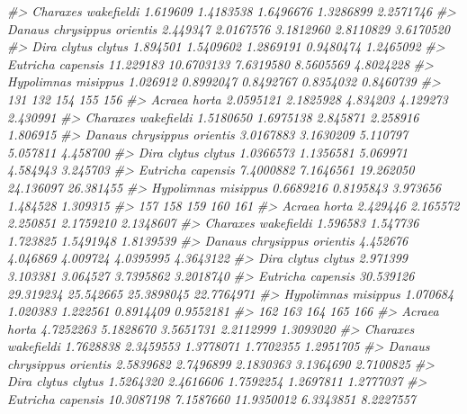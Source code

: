 \documentclass[
]{article}
\newenvironment{Shaded}{\begin{snugshade}}{\end{snugshade}}
\newcommand{\CommentTok}[1]{\textcolor[rgb]{0.56,0.35,0.01}{\textit{#1}}}
\begin{document}
\begin{Shaded}
\begin{Highlighting}[]
\CommentTok{\#\textgreater{} Charaxes wakefieldi         1.619609  1.4183538 1.6496676 1.3286899 2.2571746}
\CommentTok{\#\textgreater{} Danaus chrysippus orientis  2.449347  2.0167576 3.1812960 2.8110829 3.6170520}
\CommentTok{\#\textgreater{} Dira clytus clytus          1.894501  1.5409602 1.2869191 0.9480474 1.2465092}
\CommentTok{\#\textgreater{} Eutricha capensis          11.229183 10.6703133 7.6319580 8.5605569 4.8024228}
\CommentTok{\#\textgreater{} Hypolimnas misippus         1.026912  0.8992047 0.8492767 0.8354032 0.8460739}
\CommentTok{\#\textgreater{}                                  131       132       154       155       156}
\CommentTok{\#\textgreater{} Acraea horta               2.0595121 2.1825928  4.834203  4.129273  2.430991}
\CommentTok{\#\textgreater{} Charaxes wakefieldi        1.5180650 1.6975138  2.845871  2.258916  1.806915}
\CommentTok{\#\textgreater{} Danaus chrysippus orientis 3.0167883 3.1630209  5.110797  5.057811  4.458700}
\CommentTok{\#\textgreater{} Dira clytus clytus         1.0366573 1.1356581  5.069971  4.584943  3.245703}
\CommentTok{\#\textgreater{} Eutricha capensis          7.4000882 7.1646561 19.262050 24.136097 26.381455}
\CommentTok{\#\textgreater{} Hypolimnas misippus        0.6689216 0.8195843  3.973656  1.484528  1.309315}
\CommentTok{\#\textgreater{}                                  157       158       159        160        161}
\CommentTok{\#\textgreater{} Acraea horta                2.429446  2.165572  2.250851  2.1759210  2.1348607}
\CommentTok{\#\textgreater{} Charaxes wakefieldi         1.596583  1.547736  1.723825  1.5491948  1.8139539}
\CommentTok{\#\textgreater{} Danaus chrysippus orientis  4.452676  4.046869  4.009724  4.0395995  4.3643122}
\CommentTok{\#\textgreater{} Dira clytus clytus          2.971399  3.103381  3.064527  3.7395862  3.2018740}
\CommentTok{\#\textgreater{} Eutricha capensis          30.539126 29.319234 25.542665 25.3898045 22.7764971}
\CommentTok{\#\textgreater{} Hypolimnas misippus         1.070684  1.020383  1.222561  0.8914409  0.9552181}
\CommentTok{\#\textgreater{}                                   162       163        164       165       166}
\CommentTok{\#\textgreater{} Acraea horta                4.7252263 5.1828670  3.5651731 2.2112999 1.3093020}
\CommentTok{\#\textgreater{} Charaxes wakefieldi         1.7628838 2.3459553  1.3778071 1.7702355 1.2951705}
\CommentTok{\#\textgreater{} Danaus chrysippus orientis  2.5839682 2.7496899  2.1830363 3.1364690 2.7100825}
\CommentTok{\#\textgreater{} Dira clytus clytus          1.5264320 2.4616606  1.7592254 1.2697811 1.2777037}
\CommentTok{\#\textgreater{} Eutricha capensis          10.3087198 7.1587660 11.9350012 6.3343851 8.2227557}

\end{Highlighting}
\end{Shaded}
\end{document}
